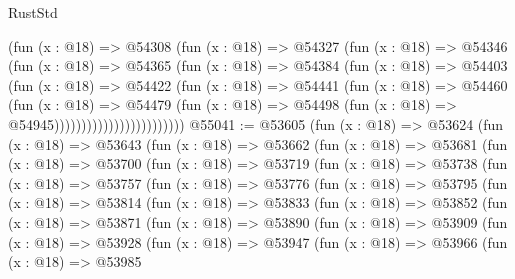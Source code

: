 \begin{lexlean}{RustStd}
\begin{coremodule}
{\begin{coremodule}
{{{{{{{{{{{{{{{{{{{{{{{{{{{{{{{{{{{{{{{{{{{{{{{{{{{{{{{{{{{{{{{{{{{{{{{{{{{{{{{{                            (fun (x : @18) =>
                            @54308
                              (fun (x : @18) =>
                              @54327
                                (fun (x : @18) =>
                                @54346
                                  (fun (x : @18) =>
                                  @54365
                                    (fun (x : @18) =>
                                    @54384
                                      (fun (x : @18) =>
                                      @54403
                                        (fun (x : @18) =>
                                        @54422
                                          (fun (x : @18) =>
                                          @54441
                                            (fun (x : @18) =>
                                            @54460
                                              (fun (x : @18) =>
                                              @54479
                                                (fun (x : @18) =>
                                                @54498
                                                  (fun (x : @18) => @54945))))))))))))))))))))))))
@55041 := @53605
    (fun (x : @18) =>
    @53624
      (fun (x : @18) =>
      @53643
        (fun (x : @18) =>
        @53662
          (fun (x : @18) =>
          @53681
            (fun (x : @18) =>
            @53700
              (fun (x : @18) =>
              @53719
                (fun (x : @18) =>
                @53738
                  (fun (x : @18) =>
                  @53757
                    (fun (x : @18) =>
                    @53776
                      (fun (x : @18) =>
                      @53795
                        (fun (x : @18) =>
                        @53814
                          (fun (x : @18) =>
                          @53833
                            (fun (x : @18) =>
                            @53852
                              (fun (x : @18) =>
                              @53871
                                (fun (x : @18) =>
                                @53890
                                  (fun (x : @18) =>
                                  @53909
                                    (fun (x : @18) =>
                                    @53928
                                      (fun (x : @18) =>
                                      @53947
                                        (fun (x : @18) =>
                                        @53966
                                          (fun (x : @18) =>
                                          @53985
}}}}}}}}}}}}}}}}}}}}}}}}}}}}}}}}}}}}}}}}}}}}}}}}}}}}}}}}}}}}}}}}}}}}}}}}}}}}}}}}
\end{coremodule}}
\end{coremodule}
\end{lexlean}
